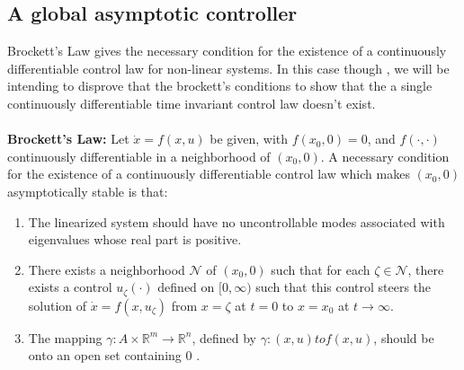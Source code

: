 \documentclass{article}
\begin{document}
\subsection{A global asymptotic controller}
Brockett's Law gives the necessary condition for the existence of
a continuously differentiable control law for non-linear systems. In this 
case though , we will be intending to disprove that the brockett's conditions
to show that the a single continuously differentiable time invariant control law 
doesn't exist.
\\
\\
\textbf{Brockett's Law:}
Let \( \dot{x} = f(x, u) \) be given, with \( f(x_0, 0) = 0 \), and \( f(\cdot, \cdot) \) continuously differentiable in a neighborhood of \( (x_0, 0) \). A necessary condition for the existence of a continuously differentiable control law which makes \( (x_0, 0) \) asymptotically stable is that:
\\
\begin{enumerate}
    \item The linearized system should have no uncontrollable modes associated with eigenvalues whose real part is positive.
    
    \item There exists a neighborhood \( \mathcal{N} \) of \( (x_0, 0) \) such that for each \( \zeta \in \mathcal{N} \), there exists a control \( u_\zeta(\cdot) \) defined on \( [0, \infty) \) such that this control steers the solution of \( \dot{x} = f(x, u_\zeta) \) from \( x = \zeta \) at \( t = 0 \) to \( x = x_0 \) at \( t \to \infty \).
    
    \item The mapping \( \gamma : A \times \mathbb{R}^m \to \mathbb{R}^n \), defined by \( \gamma : (x, u) to f(x, u) \), should be onto an open set containing 0 .
\end{enumerate}
\end{document}
